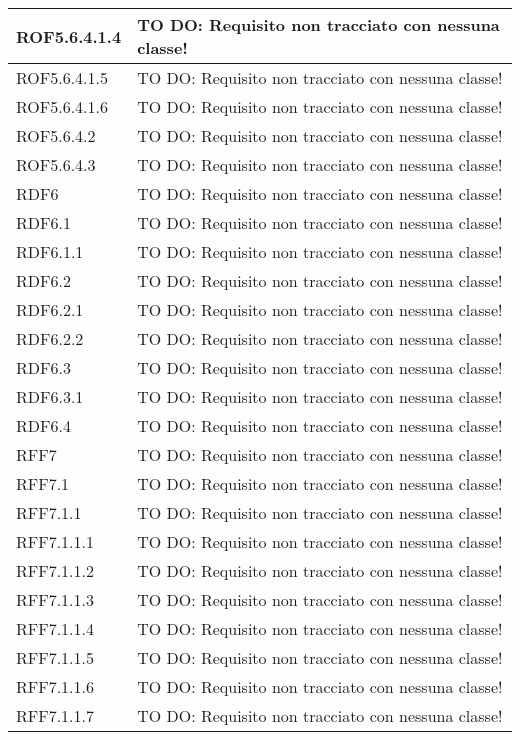 \begin{center}
\begin{longtable}{| p{2.5cm} | p{11cm} |}
\hline
ROF5.6.4.1.4 & TO DO: Requisito non tracciato con nessuna classe! \\
\hline
ROF5.6.4.1.5 & TO DO: Requisito non tracciato con nessuna classe! \\
\hline
ROF5.6.4.1.6 & TO DO: Requisito non tracciato con nessuna classe! \\
\hline
ROF5.6.4.2 & TO DO: Requisito non tracciato con nessuna classe! \\
\hline
ROF5.6.4.3 & TO DO: Requisito non tracciato con nessuna classe! \\
\hline
RDF6 & TO DO: Requisito non tracciato con nessuna classe! \\
\hline
RDF6.1 & TO DO: Requisito non tracciato con nessuna classe! \\
\hline
RDF6.1.1 & TO DO: Requisito non tracciato con nessuna classe! \\
\hline
RDF6.2 & TO DO: Requisito non tracciato con nessuna classe! \\
\hline
RDF6.2.1 & TO DO: Requisito non tracciato con nessuna classe! \\
\hline
RDF6.2.2 & TO DO: Requisito non tracciato con nessuna classe! \\
\hline
RDF6.3 & TO DO: Requisito non tracciato con nessuna classe! \\
\hline
RDF6.3.1 & TO DO: Requisito non tracciato con nessuna classe! \\
\hline
RDF6.4 & TO DO: Requisito non tracciato con nessuna classe! \\
\hline
RFF7 & TO DO: Requisito non tracciato con nessuna classe! \\
\hline
RFF7.1 & TO DO: Requisito non tracciato con nessuna classe! \\
\hline
RFF7.1.1 & TO DO: Requisito non tracciato con nessuna classe! \\
\hline
RFF7.1.1.1 & TO DO: Requisito non tracciato con nessuna classe! \\
\hline
RFF7.1.1.2 & TO DO: Requisito non tracciato con nessuna classe! \\
\hline
RFF7.1.1.3 & TO DO: Requisito non tracciato con nessuna classe! \\
\hline
RFF7.1.1.4 & TO DO: Requisito non tracciato con nessuna classe! \\
\hline
RFF7.1.1.5 & TO DO: Requisito non tracciato con nessuna classe! \\
\hline
RFF7.1.1.6 & TO DO: Requisito non tracciato con nessuna classe! \\
\hline
RFF7.1.1.7 & TO DO: Requisito non tracciato con nessuna classe! \\

\end{longtable}
\end{center}
